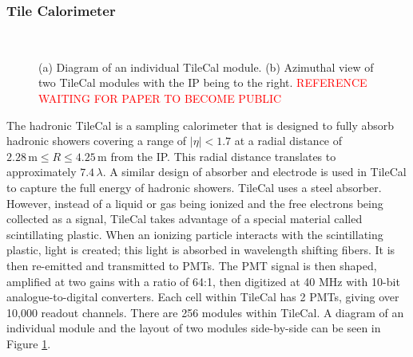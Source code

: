 		\subsubsection{Tile Calorimeter}\label{sssec:Tile}
			\begin{figure}[!ht]
			\centering
			 \\
			\caption{\label{fig:tile-modules} (a) Diagram of an individual \gls{TileCal} module. (b) Azimuthal view of two \gls{TileCal} modules with the \gls{IP} being to the right. \textcolor{red}{REFERENCE WAITING FOR PAPER TO BECOME PUBLIC}}
			\end{figure}
			The hadronic \gls{TileCal} is a sampling calorimeter that is designed to fully absorb hadronic showers covering a range of $|\eta|<1.7$ at a radial distance of $2.28 \, \mathrm{m} \leq R \leq 4.25 \, \mathrm{m}$ from the \gls{IP}. This radial distance translates to approximately $7.4\, \lambda$. A similar design of absorber and electrode is used in \gls{TileCal} to capture the full energy of hadronic showers. \gls{TileCal} uses a steel absorber. However, instead of a liquid or gas being ionized and the free electrons being collected as a signal, \gls{TileCal} takes advantage of a special material called scintillating plastic. When an ionizing particle interacts with the scintillating plastic, light is created; this light is absorbed in wavelength shifting fibers. It is then re-emitted and transmitted to \glspl{PMT}. The \gls{PMT} signal is then shaped, amplified at two gains with a ratio of 64:1, then digitized at 40 MHz with 10-bit analogue-to-digital converters. Each cell within \gls{TileCal} has 2 \glspl{PMT}, giving over 10,000 readout channels. There are 256 modules within \gls{TileCal}. A diagram of an individual module and the layout of two modules side-by-side can be seen in Figure \ref{fig:tile-modules}.
			


